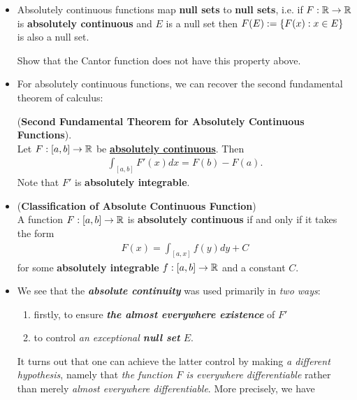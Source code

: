 \documentclass[11pt]{article}
\begin{document}
\begin{itemize}
\item \begin{proposition}
Absolutely continuous functions map \textbf{null sets} to \textbf{null sets}, i.e. if $F : {\mathbb R} \rightarrow {\mathbb R}$ is \textbf{absolutely continuous} and $E$ is a null set then $F(E) := \left\{F(x): x \in E\right\}$ is also a null set.
\end{proposition} 

\begin{exercise}
Show that the Cantor function does not have this property above.
\end{exercise}

\item For absolutely continuous functions, we can recover the second fundamental theorem of calculus:
\begin{theorem} (\textbf{Second Fundamental Theorem for Absolutely Continuous Functions}).\\
Let $F: [a, b] \rightarrow {\mathbb R}$ be \underline{\textbf{absolutely continuous}}. Then
\begin{align*}
\int_{[a, b]}F'(x) dx = F(b) - F(a).
\end{align*} Note that $F'$ is \textbf{absolutely integrable}. 
\end{theorem}

\item \begin{proposition} (\textbf{Classification of Absolute Continuous Function})\\
A function $F: [a, b] \rightarrow {\mathbb R}$ is \textbf{absolutely continuous} if and only if it takes the form 
\begin{align*}
F(x) = \int_{[a,x]} f(y) dy + C
\end{align*} for some \textbf{absolutely integrable} $f: [a, b] \rightarrow {\mathbb R}$ and a constant $C$.
\end{proposition}

\item \begin{remark}
We see that the \emph{\textbf{absolute continuity}} was used primarily in \emph{two ways}: 
\begin{enumerate}
\item firstly, to ensure \emph{\textbf{the almost everywhere existence}} of $F'$
\item to control \emph{an exceptional \textbf{null set} $E$}.
\end{enumerate}
It turns out that one can achieve the latter control by making \emph{a different hypothesis}, namely that \emph{the function $F$ is everywhere differentiable} rather than merely \emph{almost everywhere differentiable}. More
precisely, we have
\end{remark}


\end{itemize}
\end{document}
